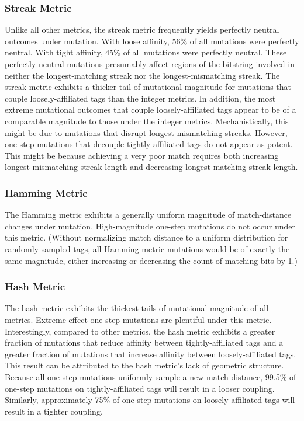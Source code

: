\subsubsection{Streak Metric}

Unlike all other metrics, the streak metric frequently yields perfectly neutral outcomes under mutation.
With loose affinity, 56\% of all mutations were perfectly neutral.
With tight affinity, 45\% of all mutations were perfectly neutral.
These perfectly-neutral mutations presumably affect regions of the bitstring involved in neither the longest-matching streak nor the longest-mismatching streak.
The streak metric exhibits a thicker tail of mutational magnitude for mutations that couple loosely-affiliated tags than the integer metrics.
In addition, the most extreme mutational outcomes that couple loosely-affiliated tags appear to be of a comparable magnitude to those under the integer metrics.
Mechanistically, this might be due to mutations that disrupt longest-mismatching streaks.
However, one-step mutations that decouple tightly-affiliated tags do not appear as potent.
This might be because achieving a very poor match requires both increasing longest-mismatching streak length and decreasing longest-matching streak length.

\subsubsection{Hamming Metric}

The Hamming metric exhibits a generally uniform magnitude of match-distance changes under mutation.
High-magnitude one-step mutations do not occur under this metric.
(Without normalizing match distance to a uniform distribution for randomly-sampled tags, all Hamming metric mutations would be of exactly the same magnitude, either increasing or decreasing the count of matching bits by 1.)

\subsubsection{Hash Metric}

The hash metric exhibits the thickest tails of mutational magnitude of all metrics.
Extreme-effect one-step mutations are plentiful under this metric.
Interestingly, compared to other metrics, the hash metric exhibits a greater fraction of mutations that reduce affinity between tightly-affiliated tags and a greater fraction of mutations that increase affinity between loosely-affiliated tags.
This result can be attributed to the hash metric's lack of geometric structure.
Because all one-step mutations uniformly sample a new match distance, 99.5\% of one-step mutations on tightly-affiliated tags will result in a looser coupling.
Similarly, approximately 75\% of one-step mutations on loosely-affiliated tags will result in a tighter coupling.

